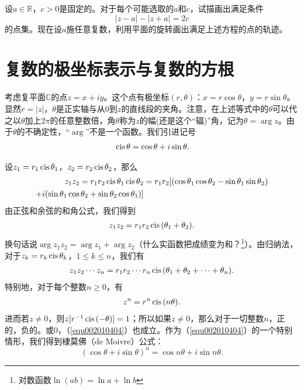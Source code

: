 \begin{exercise}
设$a \in \mathbb{R}$，$c > 0$是固定的。对于每个可能选取的$a$和$c$，试描画出满足条件
\[
|z-a| - |z+a|=2c
\]
的点集。现在设$a$施任意复数，利用平面的旋转画出满足上述方程的点的轨迹。
\end{exercise}

\section{复数的极坐标表示与复数的方根}\label{subsection0020104}
考虑复平面$\mathbb{C}$的点$z=x+iy$。这个点有极坐标$(r, \theta)$：$x=r\cos{\theta}$，$y=r\sin{\theta}$。显然$r=|z|$，$\theta$是正实轴与从0到$z$的直线段的夹角。注意，在上述等式中的$\theta$可以代之以$\theta$加上$2\pi$的任意整数倍，角$\theta$称为$z$的幅(还是这个“辐)”角，记为$\theta=\arg{z}$。由于$\theta$的不确定性，“$\arg$”不是一个函数。我们引进记号
\begin{gather}\label{equ002010401}
\,\text{cis}\,{\theta}=\cos{\theta}+i\sin{\theta}.
\end{gather}

设$z_1=r_1\,\text{cis}\,{\theta_1}$，$z_2=r_2\,\text{cis}\,{\theta_2}$，那么
\[
\begin{aligned}
z_1z_2=r_1r_2\,\text{cis}\,{\theta_1}\,\text{cis}\,{\theta_2}&=r_1r_2[(\cos{\theta_1}\cos{\theta_2}-\sin{\theta_1}\sin{}\theta_2)\\
+i(\sin{\theta_1}\cos{\theta_2}+\sin{\theta_2}\cos{\theta_1})]
\end{aligned}
\]
由正弦和余弦的和角公式，我们得到
\begin{gather}\label{equ002010402}
z_1z_2 = r_1r_2\,\text{cis}\,(\theta_1+\theta_2).
\end{gather}
换句话说$\arg{z_1z_2} = \arg{z_1} + \arg{z_2}$（什么实函数把成绩变为和？\footnote{对数函数$\ln{(ab)}=\ln{a}+\ln{b}$}）。由归纳法，对于$z_k=r_k\,\text{cis}\,{\theta_k}$，$1 \le k \le n$，我们有
\begin{gather}\label{equ002010403}
z_1z_2\cdots{}z_n=r_1r_2\cdots{}r_n\,\text{cis}\,{(\theta_1+\theta_2+\cdots+\theta_n)}.
\end{gather}
特别地，对于每个整数$n \ge 0$，有
\begin{gather}\label{equ002010404}
z^n = r^n\,\text{cis}\,(n\theta).
\end{gather}
进而若$z \neq 0$，则$z[r^{-1}\,\text{cis}\,(-\theta)]=1$；所以如果$z \neq 0$，那么对于一切整数$n$，正的，负的。或0，（\ref{equ002010404}）也成立。作为（\ref{equ002010404}）的一个特别情形，我们得到棣莫佛（de Moivre）公式：
\[
(\cos{\theta}+i\sin{\theta})^n=\cos{n\theta} + i\sin{n\theta}.
\]

